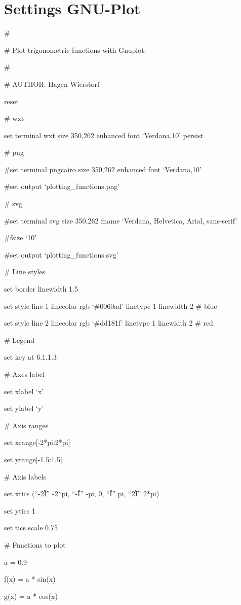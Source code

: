 \documentclass[letterpaper,10pt,english]{sphinxmanual}
\begin{document}
\chapter{Settings GNU-Plot}
\label{appendix:gnu-plot}\label{appendix:appendix}\label{appendix::doc}\label{appendix:settings-gnu-plot}
\#

\# Plot trigonometric functions with Gnuplot.

\#

\# AUTHOR: Hagen Wierstorf

reset

\# wxt

set terminal wxt size 350,262 enhanced font `Verdana,10' persist

\# png

\#set terminal pngcairo size 350,262 enhanced font `Verdana,10'

\#set output `plotting\_functions.png'

\# svg

\#set terminal svg size 350,262 fname `Verdana, Helvetica, Arial, sans-serif' 

\#fsize `10'

\#set output `plotting\_functions.svg'

\# Line styles

set border linewidth 1.5

set style line 1 linecolor rgb `\#0060ad' linetype 1 linewidth 2  \# blue

set style line 2 linecolor rgb `\#dd181f' linetype 1 linewidth 2  \# red

\# Legend

set key at 6.1,1.3

\# Axes label

set xlabel `x'

set ylabel `y'

\# Axis ranges

set xrange{[}-2*pi:2*pi{]}

set yrange{[}-1.5:1.5{]}

\# Axis labels

set xtics (``-2Ï\texteuro{}'' -2*pi, ``-Ï\texteuro{}'' -pi, 0, ``Ï\texteuro{}'' pi, ``2Ï\texteuro{}'' 2*pi)

set ytics 1

set tics scale 0.75

\# Functions to plot

a = 0.9

f(x) = a * sin(x)

g(x) = a * cos(x)
\end{document}
